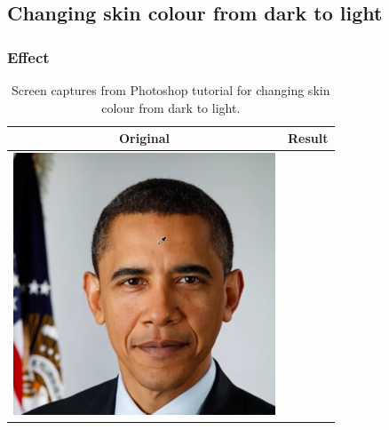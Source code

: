 \subsection{Changing skin colour from dark to light \cite{photoshop:obama}}\label{app:photoshop_obama}

\subsubsection*{Effect}
\begin{longtable}{|c|c|}
    \caption{Screen captures from Photoshop tutorial for changing skin colour from dark to light.}\\
    \hline
    Original & Result \\
    \hline
  \begin{minipage}{.29\textwidth}
    \includegraphics[width=\textwidth,height=\textheight,keepaspectratio]{images/obama_orig}
  \end{minipage} & 
  \begin{minipage}{.29\textwidth}

\end{minipage}
\end{longtable}
